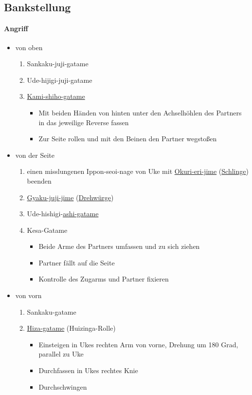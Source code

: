 \documentclass[justified, a4paper, notitlepage, captions=tableheading, nobib]{tufte-handout}
\begin{document}
\subsection{\label{org37bd524}Bankstellung }
\label{sec:orgd02db67}
\paragraph{Angriff}
\label{sec:org32afcdc}
\begin{itemize}
\item von oben
\begin{enumerate}
\item Sankaku-juji-gatame
\item Ude-hijigi-juji-gatame
\item \hyperref[org79c6e2f]{Kami-shiho-gatame}
\begin{itemize}
\item Mit beiden Händen von hinten unter den Achselhöhlen des Partners in das jeweilige Reverse fassen
\item Zur Seite rollen und mit den Beinen den Partner wegstoßen
\end{itemize}
\end{enumerate}
\item von der Seite
\begin{enumerate}
\item einen misslungenen Ippon-seoi-nage von Uke mit \hyperref[org41b7fb1]{Okuri-eri-jime} (\hyperref[org4110e60]{Schlinge}) beenden
\item \hyperref[org8b33e39]{Gyaku-juji-jime} (\hyperref[org5a5933b]{Drehwürge})
\item Ude-hishigi-\hyperref[org8026a3f]{ashi-gatame}
\item Kesa-Gatame
\begin{itemize}
\item Beide Arme des Partners umfassen und zu sich ziehen
\item Partner fällt auf die Seite
\item Kontrolle des Zugarms und Partner fixieren
\end{itemize}
\end{enumerate}
\item von vorn
\begin{enumerate}
\item Sankaku-gatame
\item \hyperref[orge854c9c]{Hiza-gatame} (Huizinga-Rolle)
\begin{itemize}
\item Einsteigen in Ukes rechten Arm von vorne, Drehung um 180 Grad, parallel zu Uke
\item Durchfassen in Ukes rechtes Knie
\item Durchschwingen
\end{itemize}
\end{enumerate}
\end{itemize}
\end{document}
